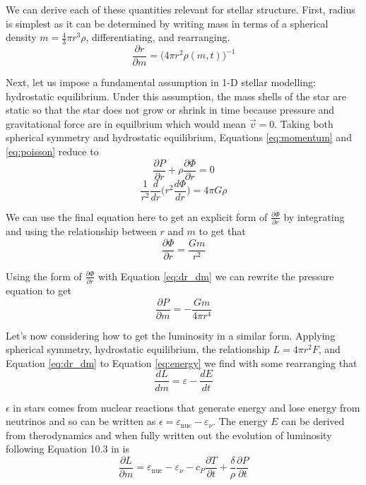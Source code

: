 We can derive each of these quantities relevant for stellar structure. 
First, radius is simplest as it can be determined by writing mass in terms of a spherical density $m=\frac{4}{3}\pi r^3\rho$, differentiating, and rearranging.
\begin{equation}\label{eq:dr_dm}
    \frac{\partial r}{\partial m} = \Biggl(4\pi r^2 \rho(m,t)\Biggr)^{-1}
\end{equation}

Next, let us impose a fundamental assumption in 1-D stellar modelling: hydrostatic equilibrium.
Under this assumption, the mass shells of the star are static so that the star does not grow or shrink in time because pressure and gravitational force are in equilbrium which would mean $\vec{v}=0$. 
Taking both spherical symmetry and hydrostatic equilibrium, Equations \ref{eq:momentum} and \ref{eq:poisson} reduce to 
\[
    \frac{\partial P}{\partial r} + \rho \frac{\partial\Phi}{\partial r} = 0
\]
\[
    \frac{1}{r^2}\frac{d}{dr}\Biggl(r^2\frac{d \Phi}{dr}\Biggr)=4\pi G\rho
\]

We can use the final equation here to get an explicit form of $\frac{\partial \Phi}{\partial r}$ by integrating and using the relationship between $r$ and $m$ to get that 
\[
    \frac{\partial \Phi}{\partial r} = \frac{Gm}{r^2}
\]

Using the form of $\frac{\partial \Phi}{\partial r}$ with Equation \ref{eq:dr_dm} we can rewrite the pressure equation to get
\begin{equation}\label{eq:dP_dm}
    \frac{\partial P}{\partial m} = -\frac{Gm}{4\pi r^4}
\end{equation}

Let's now considering how to get the luminosity in a similar form.
Applying spherical symmetry, hydrostatic equilibrium, the relationship $L=4\pi r^2 F$, and Equation \ref{eq:dr_dm} to Equation \ref{eq:energy} we find with some rearranging that 
\[
    \frac{dL}{dm} = \varepsilon - \frac{dE}{dt}
\]

$\epsilon$ in stars comes from nuclear reactions that generate energy and lose energy from neutrinos and so can be written as $\epsilon =\varepsilon_{\mathrm{nuc}}-\varepsilon_\nu$.
The energy $E$ can be derived from therodynamics and when fully written out the evolution of luminosity following Equation 10.3 in \cite{kippenhahnStellarStructureEvolution2013} is
\begin{equation}
    \frac{\partial L}{\partial m} = \varepsilon_{\mathrm{nuc}}-\varepsilon_\nu - c_P\frac{\partial T}{\partial t}+\frac{\delta}{\rho}\frac{\partial P}{\partial t}
\end{equation}

